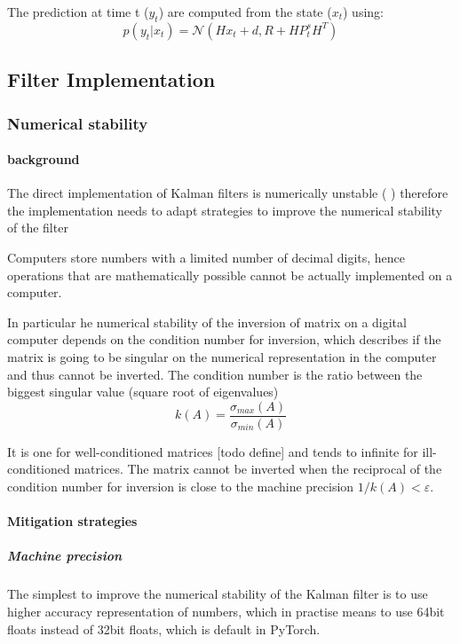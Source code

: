 \documentclass{article}
\begin{document}
The prediction at time t ($y_t$) are computed from the state ($x_t$) using:
$$p(y_t|x_t) = \mathcal{N}(Hx_t + d, R + HP^s_tH^T)$$

\subsection{Filter Implementation}

\subsubsection{Numerical stability}

\paragraph{background}
The direct implementation of Kalman filters is numerically unstable (\cite{mohinder_s_grewal_kalman_2001} \cite{dan_simon_optimal_2006}) therefore the implementation needs to adapt strategies to improve the numerical stability of the filter

Computers store numbers with a limited number of decimal digits, hence operations that are mathematically possible cannot be actually implemented on a computer.

In particular he numerical stability of the inversion of matrix on a digital computer depends on the condition number for inversion, which describes if the matrix is going to be singular on the numerical representation in the computer and thus cannot be inverted. The condition number is the ratio between the biggest singular value (square root of eigenvalues)
\begin{equation}\label{condition_number}
    k(A) = \frac{\sigma_{max}(A)}{\sigma_{min}(A)}
\end{equation}

It is one for well-conditioned matrices [todo define] and tends to infinite for ill-conditioned matrices.
The matrix cannot be inverted when the reciprocal of the condition number for inversion is close to the machine precision $ 1/k(A) < \varepsilon$.

\paragraph{Mitigation strategies}

\subparagraph{Machine precision} The simplest to improve the numerical stability of the Kalman filter is to use higher accuracy representation of numbers, which in practise means to use 64bit floats instead of 32bit floats, which is default in PyTorch.
\end{document}
